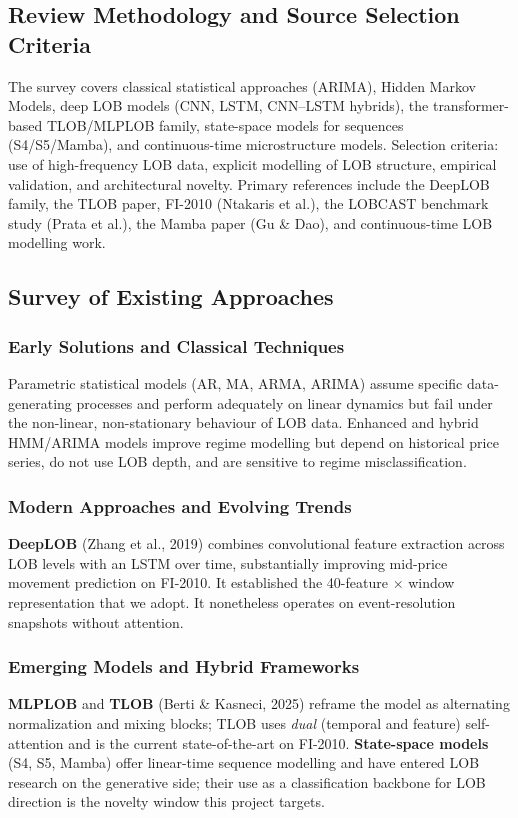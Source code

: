 \documentclass[11pt]{article}
\begin{document}
\subsection{Review Methodology and Source Selection Criteria}
The survey covers classical statistical approaches (ARIMA), Hidden Markov Models, deep LOB models
(CNN, LSTM, CNN--LSTM hybrids), the transformer-based TLOB/MLPLOB family, state-space models for sequences
(S4/S5/Mamba), and continuous-time microstructure models. Selection criteria: use of high-frequency LOB
data, explicit modelling of LOB structure, empirical validation, and architectural novelty. Primary
references include the DeepLOB family, the TLOB paper, FI-2010 (Ntakaris et al.), the LOBCAST benchmark
study (Prata et al.), the Mamba paper (Gu \& Dao), and continuous-time LOB modelling work.

\subsection{Survey of Existing Approaches}
\subsubsection{Early Solutions and Classical Techniques}
Parametric statistical models (AR, MA, ARMA, ARIMA) assume specific data-generating processes and perform
adequately on linear dynamics but fail under the non-linear, non-stationary behaviour of LOB data. Enhanced
and hybrid HMM/ARIMA models improve regime modelling but depend on historical price series, do not use LOB
depth, and are sensitive to regime misclassification.

\subsubsection{Modern Approaches and Evolving Trends}
\textbf{DeepLOB} (Zhang et al., 2019) combines convolutional feature extraction across LOB levels with an
LSTM over time, substantially improving mid-price movement prediction on FI-2010. It established the
40-feature $\times$ window representation that we adopt. It nonetheless operates on event-resolution
snapshots without attention.

\subsubsection{Emerging Models and Hybrid Frameworks}
\textbf{MLPLOB} and \textbf{TLOB} (Berti \& Kasneci, 2025) reframe the model as alternating normalization and
mixing blocks; TLOB uses \emph{dual} (temporal and feature) self-attention and is the current
state-of-the-art on FI-2010. \textbf{State-space models} (S4, S5, Mamba) offer linear-time sequence
modelling and have entered LOB research on the generative side; their use as a classification backbone for
LOB direction is the novelty window this project targets.
\end{document}
